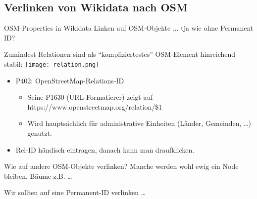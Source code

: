 \documentclass{beamer}
\begin{document}
\subsection{Verlinken von Wikidata nach OSM}

\begin{frame}{OSM-Properties in Wikidata}
  Linken auf OSM-Objekte ... tja wie ohne Permanent ID?

 \vspace*{0.2cm}
 Zumindest Relationen sind als "`kompliziertestes"' OSM-Element hinreichend stabil: \texttt{[image: relation.png]}

\begin{itemize}
  \item P402: OpenStreetMap-Relations-ID
  \begin{itemize}
    \item Seine P1630 (URL-Formatierer) zeigt auf https://www.openstreetmap.org/relation/\$1
    \item Wird hauptsächlich für administrative Einheiten (Länder, Gemeinden, \dots) genutzt.
  \end{itemize}

  \pause
  \item Rel-ID händisch eintragen, danach kann man draufklicken.

\end{itemize}



Wie auf andere OSM-Objekte verlinken? Manche werden wohl ewig ein Node bleiben, Bäume z.B. \dots

Wir sollten auf eine Permanent-ID verlinken \dots 


\end{frame}
\end{document}
